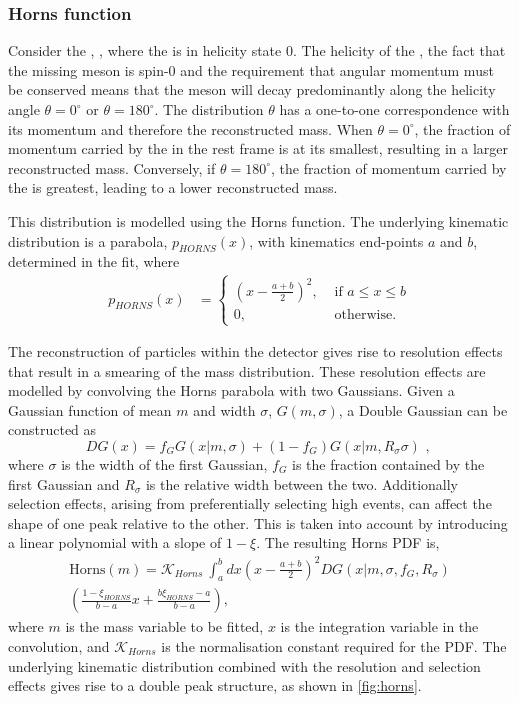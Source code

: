 \subsubsection{Horns function}

Consider the \decay{\Bm}{\Dstarz\Kstarm}, \decay{\Dstarz}{\Dz\piz}, where the \Dstarz is in helicity state 0. The helicity of the \Dstarz, the fact that the missing \piz meson is spin-0 and the requirement that angular momentum must be conserved means that the \piz meson will decay predominantly along the helicity angle $\theta = 0^{\circ}$ or $\theta = 180^{\circ}$. The distribution $\theta$ has a one-to-one correspondence with its momentum and therefore the reconstructed \Bm mass. When $\theta = 0^{\circ}$, the fraction of momentum carried by the \piz in the \Bm rest frame is at its smallest, resulting in a larger reconstructed \Bm mass. Conversely, if $\theta = 180^{\circ}$, the fraction of momentum carried by the \piz is greatest, leading to a lower reconstructed \Bm mass.

This distribution is modelled using the Horns function. The underlying kinematic distribution is a parabola, $p_{HORNS}(x)$, with kinematics end-points $a$ and $b$, determined in the fit, where
\begin{align}
p_{HORNS}(x) &= \begin{cases}
\left(x - \frac{a+b}{2}\right)^2, & \text{ if $a \leq x \leq b$}\\ 	
0, & \text{ otherwise.}
\end{cases} 
\end{align}

The reconstruction of particles within the \lhcb detector gives rise to resolution effects that result in a smearing of the mass distribution. These resolution effects are modelled by convolving the Horns parabola with two Gaussians. Given a Gaussian function of mean $m$ and width $\sigma$, $G(m,\sigma)$, a Double Gaussian can be constructed as
\begin{equation}
DG(x) = f_G G(x|m,\sigma) + \left(1-f_G\right) G(x|m,R_{\sigma}\sigma) \text{ , }
\end{equation}
where $\sigma$ is the width of the first Gaussian, $f_G$ is the fraction contained by the first Gaussian and $R_{\sigma}$ is the relative width between the two. Additionally selection effects, arising from preferentially selecting high \pt events, can affect the shape of one peak relative to the other. This is taken into account by introducing a linear polynomial with a slope of $1 - \xi$. The resulting Horns PDF is,
\begin{multline}
\text{Horns}(m) = \mathcal{K}_{Horns}\ \int_a^b dx \left(x - \frac{a+b}{2}\right)^2 DG(x|m,\sigma,f_G,R_{\sigma}) \\
\left( \frac{1 - \xi_{HORNS}}{b - a}x + \frac{b\xi_{HORNS} - a}{b - a}\right),
\label{eqn:horns}
\end{multline}
where $m$ is the mass variable to be fitted, $x$ is the integration variable in the convolution, and $\mathcal{K}_{Horns}$ is the normalisation constant required for the PDF. The underlying kinematic distribution combined with the resolution and selection effects gives rise to a double peak structure, as shown in \fig\ref{fig:horns}.

